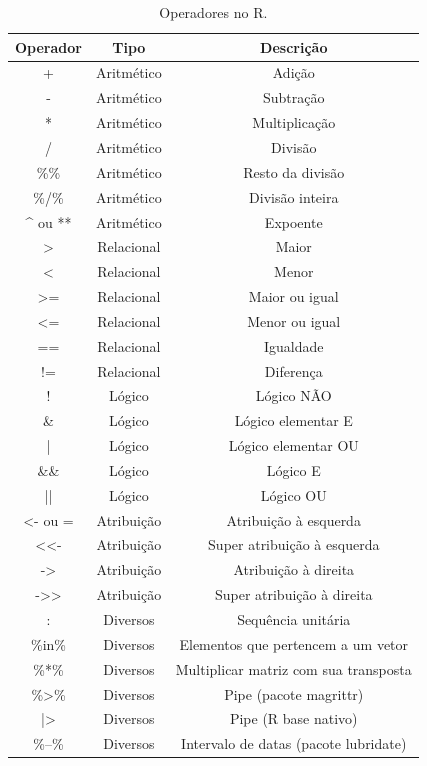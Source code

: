 \documentclass[
]{book}
\begin{document}
\begin{table}

\caption{\label{tab:tab-operadores}Operadores no R.}
\centering
\begin{tabular}[t]{c|c|c}
\hline
Operador & Tipo & Descrição\\
\hline
+ & Aritmético & Adição\\
\hline
- & Aritmético & Subtração\\
\hline
* & Aritmético & Multiplicação\\
\hline
/ & Aritmético & Divisão\\
\hline
\%\% & Aritmético & Resto da divisão\\
\hline
\%/\% & Aritmético & Divisão inteira\\
\hline
\textasciicircum{} ou ** & Aritmético & Expoente\\
\hline
> & Relacional & Maior\\
\hline
< & Relacional & Menor\\
\hline
>= & Relacional & Maior ou igual\\
\hline
<= & Relacional & Menor ou igual\\
\hline
== & Relacional & Igualdade\\
\hline
!= & Relacional & Diferença\\
\hline
! & Lógico & Lógico NÃO\\
\hline
\& & Lógico & Lógico elementar E\\
\hline
| & Lógico & Lógico elementar OU\\
\hline
\&\& & Lógico & Lógico E\\
\hline
|| & Lógico & Lógico OU\\
\hline
<- ou = & Atribuição & Atribuição à esquerda\\
\hline
<<- & Atribuição & Super atribuição à esquerda\\
\hline
-> & Atribuição & Atribuição à direita\\
\hline
->> & Atribuição & Super atribuição à direita\\
\hline
: & Diversos & Sequência unitária\\
\hline
\%in\% & Diversos & Elementos que pertencem a um vetor\\
\hline
\%*\% & Diversos & Multiplicar matriz com sua transposta\\
\hline
\%>\% & Diversos & Pipe (pacote magrittr)\\
\hline
|> & Diversos & Pipe (R base nativo)\\
\hline
\%--\% & Diversos & Intervalo de datas (pacote lubridate)\\
\hline
\end{tabular}
\end{table}
\end{document}
